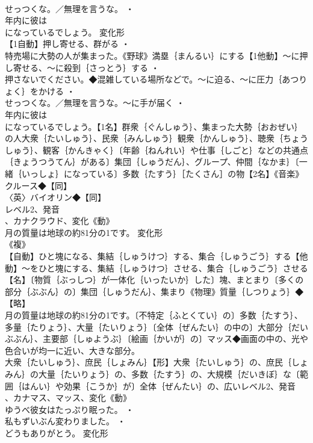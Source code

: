 \documentclass[8pt]{extreport}
\begin{document}
\begin{CJK}{UTF8}{min}
\\	せっつくな。／無理を言うな。 ・
\\	年内に彼は
\\	になっているでしょう。	変化形 
\\	【1自動】押し寄せる、群がる ・
\\	特売場に大勢の人が集まった。《野球》満塁｛まんるい｝にする【1他動】～に押し寄せる、～に殺到｛さっとう｝する ・
\\	押さないでください。◆混雑している場所などで。～に迫る、～に圧力｛あつりょく｝をかける ・
\\	せっつくな。／無理を言うな。～に手が届く ・
\\	年内に彼は
\\	になっているでしょう。【1名】群衆｛ぐんしゅう｝、集まった大勢｛おおぜい｝の人大衆｛たいしゅう｝、民衆｛みんしゅう｝観衆｛かんしゅう｝、聴衆｛ちょうしゅう｝、観客｛かんきゃく｝〔年齢｛ねんれい｝や仕事｛しごと｝などの共通点｛きょうつうてん｝がある〕集団｛しゅうだん｝、グループ、仲間｛なかま｝〔一緒｛いっしょ｝になっている〕多数｛たすう｝［たくさん］の物【2名】《音楽》クルース◆【同】
\\	〈英〉バイオリン◆【同】
\\	レベル2、発音
\\	、カナクラウド、変化《動》
\\	月の質量は地球の約81分の1です。	変化形 
\\	《複》
\\	【自動】ひと塊になる、集結｛しゅうけつ｝する、集合｛しゅうごう｝する【他動】～をひと塊にする、集結｛しゅうけつ｝させる、集合｛しゅうごう｝させる【名】〔物質｛ぶっしつ｝が一体化｛いったいか｝した〕塊、まとまり〔多くの部分｛ぶぶん｝の〕集団｛しゅうだん｝、集まり《物理》質量｛しつりょう｝◆【略】
\\	月の質量は地球の約81分の1です。〔不特定｛ふとくてい｝の〕多数｛たすう｝、多量｛たりょう｝、大量｛たいりょう｝〔全体｛ぜんたい｝の中の〕大部分｛だいぶぶん｝、主要部｛しゅようぶ｝〔絵画｛かいが｝の〕マッス◆画面の中の、光や色合いが均一に近い、大きな部分。
\\	大衆｛たいしゅう｝、庶民｛しょみん｝【形】大衆｛たいしゅう｝の、庶民｛しょみん｝の大量｛たいりょう｝の、多数｛たすう｝の、大規模｛だいきぼ｝な〔範囲｛はんい｝や効果｛こうか｝が〕全体｛ぜんたい｝の、広いレベル2、発音
\\	、カナマス、マッス、変化《動》
\\	ゆうべ彼女はたっぷり眠った。 ・
\\	私もずいぶん変わりました。 ・
\\	どうもありがとう。	変化形 

\end{CJK}
\end{document}
